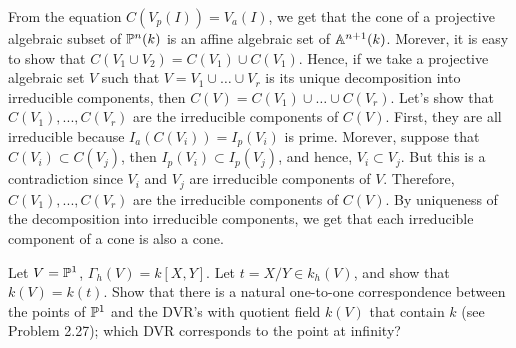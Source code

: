 \begin{solution}
    From the equation $C(V_p(I)) = V_a(I)$, we get that the cone of a projective algebraic subset of $\P^n(k)$ is an affine algebraic set of $\A^{n+1}(k)$. Morever, it is easy to show that $C(V_1 \cup V_2) = C(V_1) \cup C(V_1)$. Hence, if we take a projective algebraic set $V$ such that $V = V_1 \cup \dots \cup V_r$ is its unique decomposition into irreducible components, then $C(V) = C(V_1) \cup \dots \cup C(V_r)$. Let's show that $C(V_1), ..., C(V_r)$ are the irreducible components of $C(V)$. First, they are all irreducible because $I_a(C(V_i)) = I_p(V_i)$ is prime. Morever, suppose that $C(V_i) \subset C(V_j)$, then $I_p(V_i) \subset I_p(V_j)$, and hence, $V_i \subset V_j$. But this is a contradiction since $V_i$ and $V_j$ are irreducible components of $V$. Therefore, $C(V_1), ..., C(V_r)$ are the irreducible components of $C(V)$. By uniqueness of the decomposition into irreducible components, we get that each irreducible component of a cone is also a cone. \\
\end{solution}

\begin{exercise}
    Let $V = \P^1$, $\Gamma_h(V) = k[X,Y]$. Let $t = X/Y \in k_h(V)$, and show that $k(V) = k(t)$. Show that there is a natural one-to-one correspondence between the points of $\P^1$ and the DVR's with quotient field $k(V)$ that contain $k$ (see Problem 2.27); which DVR corresponds to the point at infinity? \\
\end{exercise}

